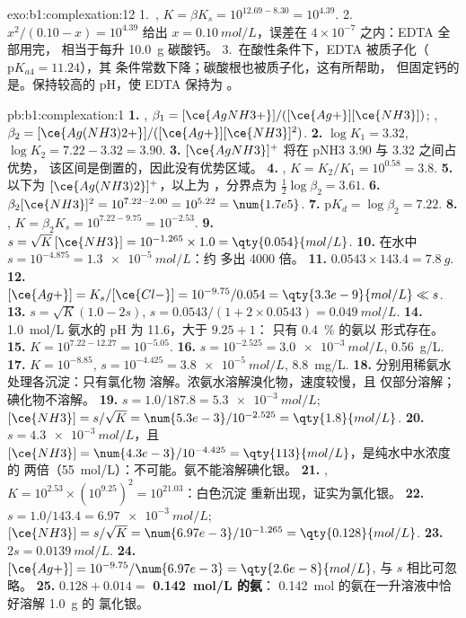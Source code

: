 \begin{solution}{exo:b1:complexation:12}
1.~, $K = \beta K_s = 10^{12.69 -
8.30} = 10^{4.39}$.
2.~$x^2/(0.10 - x) = 10^{4.39}$ 给出 $x = \qty{0.10}{mol/L}$，误差在
$4 \times 10^{-7}$ 之内：EDTA 全部用完，
相当于每升 \qty{10.0}{g} 碳酸钙。
3.~在酸性条件下，EDTA 被质子化（$\mathrm{p}K_{a4} = 11.24$），其
条件常数下降；碳酸根也被质子化，这有所帮助，
但固定钙的是。保持较高的 pH，使
EDTA 保持为 。
\end{solution}

\begin{solution}{pb:b1:complexation:1}
\textbf{1.} , $\beta_1 = [\ce{AgNH3+}]/([\ce{Ag+}][\ce{NH3}])$;
, $\beta_2 = [\ce{Ag(NH3)2+}]/([\ce{Ag+}][\ce{NH3}]^2)$.
\textbf{2.} $\log K_1 = 3.32$, $\log K_2 = 7.22 - 3.32 = 3.90$.
\textbf{3.} $[\ce{AgNH3}]^{+}$ 将在 pNH3 3.90 与 3.32 之间占优势，
该区间是倒置的，因此没有优势区域。
\textbf{4.} , $K = K_2/K_1 = 10^{0.58} =
3.8$.
\textbf{5.} 以下为 $[\ce{Ag(NH3)2}]^{+}$，以上为 ，分界点为
$\frac12\log\beta_2 = 3.61$.
\textbf{6.} $\beta_2[\ce{NH3}]^2 = 10^{7.22 - 2.00} = 10^{5.22} = \num{1.7e5}$.
\textbf{7.} $\mathrm{p}K_d = \log\beta_2 = 7.22$.
\textbf{8.} , $K = \beta_2K_s =
10^{7.22 - 9.75} = 10^{-2.53}$.
\textbf{9.} $s = \sqrt{K}\,[\ce{NH3}] = 10^{-1.265} \times 1.0 =
\qty{0.054}{mol/L}$.
\textbf{10.} 在水中 $s = 10^{-4.875} = \qty{1.3e-5}{mol/L}$：约
多出 4000 倍。
\textbf{11.} $0.0543 \times 143.4 = \qty{7.8}{g}$.
\textbf{12.} $[\ce{Ag+}] = K_s/[\ce{Cl-}] = 10^{-9.75}/0.054 =
\qty{3.3e-9}{mol/L} \ll s$.
\textbf{13.} $s = \sqrt{K}(1.0 - 2s)$, $s = 0.0543/(1 + 2 \times 0.0543) =
\qty{0.049}{mol/L}$.
\textbf{14.} \qty{1.0}{mol/L} 氨水的 pH 为 11.6，大于 $9.25 + 1$：
只有 \qty{0.4}{\percent} 的氨以  形式存在。
\textbf{15.} $K = 10^{7.22 - 12.27} = 10^{-5.05}$.
\textbf{16.} $s = 10^{-2.525} = \qty{3.0e-3}{mol/L}$, \qty{0.56}{g/L}.
\textbf{17.} $K = 10^{-8.85}$, $s = 10^{-4.425} = \qty{3.8e-5}{mol/L}$,
\qty{8.8}{mg/L}.
\textbf{18.} 分别用稀氨水处理各沉淀：只有氯化物
溶解。浓氨水溶解溴化物，速度较慢，且
仅部分溶解；碘化物不溶解。
\textbf{19.} $s = 1.0/187.8 = \qty{5.3e-3}{mol/L}$; $[\ce{NH3}] = s/\sqrt{K}
= \num{5.3e-3}/10^{-2.525} = \qty{1.8}{mol/L}$.
\textbf{20.} $s = \qty{4.3e-3}{mol/L}$，且 $[\ce{NH3}] = \num{4.3e-3}/10^{-4.425}
= \qty{113}{mol/L}$，是纯水中水浓度的
两倍（\qty{55}{mol/L}）：不可能。氨不能溶解碘化银。
\textbf{21.} ,
$K = 10^{2.53} \times (10^{9.25})^2 = 10^{21.03}$：白色沉淀
重新出现，证实为氯化银。
\textbf{22.} $s = 1.0/143.4 = \qty{6.97e-3}{mol/L}$; $[\ce{NH3}] =
s/\sqrt{K} = \num{6.97e-3}/10^{-1.265} = \qty{0.128}{mol/L}$.
\textbf{23.} $2s = \qty{0.0139}{mol/L}$.
\textbf{24.} $[\ce{Ag+}] = 10^{-9.75}/\num{6.97e-3} = \qty{2.6e-8}{mol/L}$,
与 $s$ 相比可忽略。
\textbf{25.} $0.128 + 0.014 = $ \textbf{\qty{0.142}{mol/L} 的氨}：
\qty{0.142}{mol} 的氨在一升溶液中恰好溶解 \qty{1.0}{g} 的
氯化银。
\end{solution}
